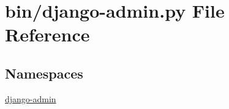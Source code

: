 \hypertarget{django-admin_8py}{\section{bin/django-\/admin.py File Reference}
\label{django-admin_8py}
}
\subsection*{Namespaces}
\begin{DoxyCompactItemize}
\item 
\hyperlink{namespacedjango-admin}{django-\/admin}
\end{DoxyCompactItemize}
